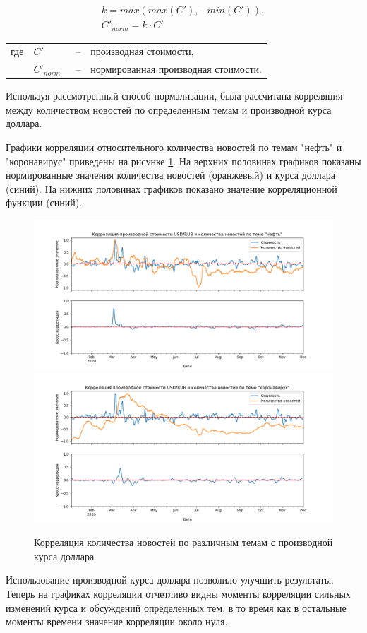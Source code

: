 \begin{equation}
    \begin{array}{l}
        k = max(max(C'), -min(C')), \\
        C'_{norm} = k \cdot C'
    \end{array}
    \label{eq:derr-normalize}
\end{equation}\noindent\begin{tabularx}{\linewidth}{lllX}
    где & $C'$         &~--& производная стоимости, \\
        & $C'_{norm}$  &~--& нормированная производная стоимости. \\
\end{tabularx}


Используя рассмотренный способ нормализации, была рассчитана корреляция между количеством новостей по определенным темам и производной курса доллара.

Графики корреляции относительного количества новостей по темам "нефть" и "коронавирус" приведены на рисунке \ref{img:correlation-derrivative}. На верхних половинах графиков показаны нормированные значения количества новостей (оранжевый) и курса доллара (синий). На нижних половинах графиков показано значение корреляционной функции (синий).

\begin{figure}[h]
    \centering
    \includegraphics[width=\linewidth]{images/correlations/derivative/нефть.png}
    \includegraphics[width=\linewidth]{images/correlations/derivative/коронавирус.png}
    \caption{Корреляция количества новостей по различным темам с производной курса доллара}
    \label{img:correlation-derrivative}
\end{figure}

Использование производной курса доллара позволило улучшить результаты. Теперь на графиках корреляции отчетливо видны моменты корреляции сильных изменений курса и обсуждений определенных тем, в то время как в остальные моменты времени значение корреляции около нуля.
